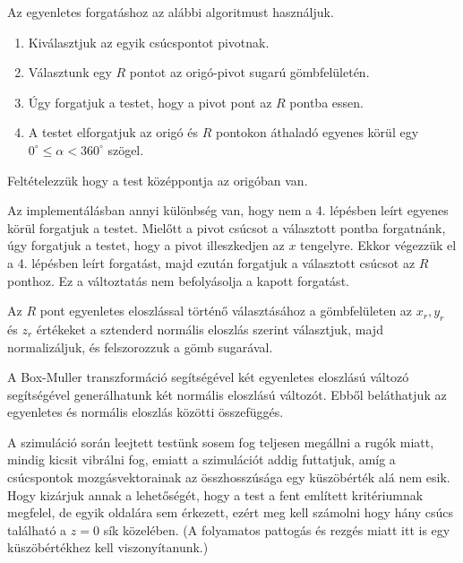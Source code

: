 \noindent Az egyenletes forgatáshoz az alábbi algoritmust használjuk.
\begin{enumerate}
	\item Kiválasztjuk az egyik csúcspontot pivotnak.
	\item Választunk egy $R$ pontot az origó-pivot sugarú gömbfelületén.
	\item Úgy forgatjuk a testet, hogy a pivot pont az $R$ pontba essen.
	\item A testet elforgatjuk az origó és $R$  pontokon áthaladó egyenes körül egy $0^\circ \leq \alpha < 360^\circ$ szögel.
\end{enumerate}
\begin{remark}
Feltételezzük hogy a test középpontja az origóban van.
\end{remark}
Az implementálásban annyi különbség van, hogy nem a 4. lépésben leírt egyenes körül forgatjuk a testet.
Mielőtt a pivot csúcsot a választott pontba forgatnánk, úgy forgatjuk a testet, hogy a pivot illeszkedjen az $x$ tengelyre.
Ekkor végezzük el a 4. lépésben leírt forgatást, majd ezután forgatjuk a választott csúcsot az $R$ ponthoz.
Ez a változtatás nem befolyásolja a kapott forgatást.

Az $R$ pont egyenletes eloszlással történő választásához a gömbfelületen az $x_r, y_r$ és $z_r$ értékeket a sztenderd normális eloszlás szerint választjuk, majd normalizáljuk, és felszorozzuk a gömb sugarával.

A Box-Muller transzformáció \cite{boxmuller} segítségével két egyenletes eloszlású változó segítségével generálhatunk két normális eloszlású változót. Ebből beláthatjuk az egyenletes és normális eloszlás közötti összefüggés.


A szimuláció során leejtett testünk sosem fog teljesen megállni a rugók miatt, mindig kicsit vibrálni fog, emiatt a szimulációt addig futtatjuk, amíg a csúcspontok mozgásvektorainak az összhosszúsága egy küszöbérték alá nem esik.
Hogy kizárjuk annak a lehetőségét, hogy a test a fent említett kritériumnak megfelel, de egyik oldalára sem érkezett, ezért meg kell számolni hogy hány csúcs található a $z=0$ sík közelében. (A folyamatos pattogás és rezgés miatt itt is egy küszöbértékhez kell viszonyítanunk.)

